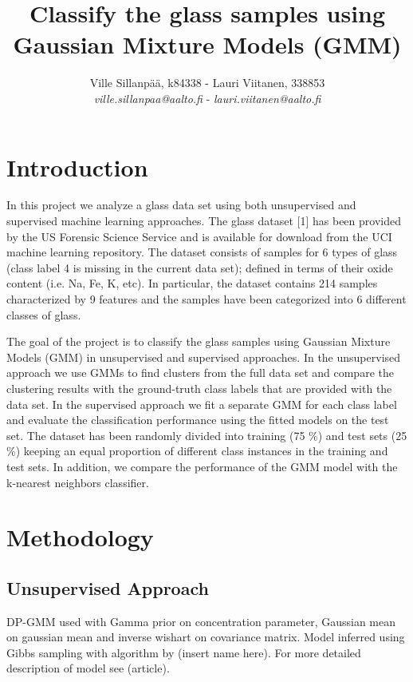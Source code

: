 \documentclass[a4paper]{article}
\title{Classify the glass samples using Gaussian Mixture Models (GMM)}
\author{Ville Sillanpää, k84338 - Lauri Viitanen, 338853 \\ 
       {\it ville.sillanpaa@aalto.fi} -
       {\it lauri.viitanen@aalto.fi}}
\begin{document}
\maketitle
\clearpage


\section{Introduction}

In this project we analyze a glass data set using both unsupervised and
supervised machine learning approaches. The glass dataset [1] has been
provided by the US Forensic Science Service and is available for download from
the UCI machine learning repository. The dataset consists of samples for 6
types of glass (class label 4 is missing in the current data set); defined in
terms of their oxide content (i.e. Na, Fe, K, etc). In particular, the dataset
contains 214 samples characterized by 9 features and the samples have been
categorized into 6 different classes of glass.

\par
The goal of the project is to classify the glass samples using Gaussian
Mixture Models (GMM) in unsupervised and supervised approaches. In the
unsupervised approach we use GMMs to find clusters from the full data set and
compare the clustering results with the ground-truth class labels that are
provided with the data set. In the supervised approach we fit a separate GMM
for each class label and evaluate the classification performance using the
fitted models on the test set. The dataset has been randomly divided into
training (75 \%) and test sets (25 \%) keeping an equal proportion of different
class instances in the training and test sets. In addition, we compare the
performance of the GMM model with the k-nearest neighbors classifier.

\section{Methodology}

\subsection{Unsupervised Approach}

DP-GMM used with Gamma prior on concentration parameter, Gaussian mean on gaussian mean and inverse wishart on covariance matrix. Model inferred using Gibbs sampling with algorithm by (insert name here). For more detailed description of model see (article).
\end{document}
